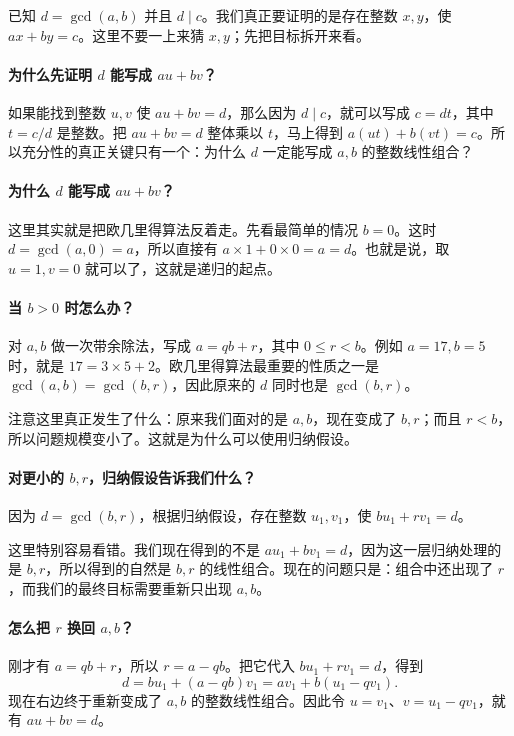 \documentclass[UTF8,a4paper,11pt,twoside,openright,fontset=fandol]{ctexbook}
\theoremstyle{definition}
\begin{document}
\begin{pitfall}[思考：这份证明为什么要这样走？]
已知 $d=\gcd(a,b)$ 并且 $d\mid c$。我们真正要证明的是存在整数 $x,y$，使 $ax+by=c$。这里不要一上来猜 $x,y$；先把目标拆开来看。

\paragraph{为什么先证明 $d$ 能写成 $au+bv$？}
如果能找到整数 $u,v$ 使 $au+bv=d$，那么因为 $d\mid c$，就可以写成 $c=dt$，其中 $t=c/d$ 是整数。把 $au+bv=d$ 整体乘以 $t$，马上得到 $a(ut)+b(vt)=c$。所以充分性的真正关键只有一个：为什么 $d$ 一定能写成 $a,b$ 的整数线性组合？

\paragraph{为什么 $d$ 能写成 $au+bv$？}
这里其实就是把欧几里得算法反着走。先看最简单的情况 $b=0$。这时 $d=\gcd(a,0)=a$，所以直接有 $a\times1+0\times0=a=d$。也就是说，取 $u=1,v=0$ 就可以了，这就是递归的起点。

\paragraph{当 $b>0$ 时怎么办？}
对 $a,b$ 做一次带余除法，写成 $a=qb+r$，其中 $0\le r<b$。例如 $a=17,b=5$ 时，就是 $17=3\times5+2$。欧几里得算法最重要的性质之一是 $\gcd(a,b)=\gcd(b,r)$，因此原来的 $d$ 同时也是 $\gcd(b,r)$。

注意这里真正发生了什么：原来我们面对的是 $a,b$，现在变成了 $b,r$；而且 $r<b$，所以问题规模变小了。这就是为什么可以使用归纳假设。

\paragraph{对更小的 $b,r$，归纳假设告诉我们什么？}
因为 $d=\gcd(b,r)$，根据归纳假设，存在整数 $u_1,v_1$，使 $bu_1+rv_1=d$。

这里特别容易看错。我们现在得到的不是 $au_1+bv_1=d$，因为这一层归纳处理的是 $b,r$，所以得到的自然是 $b,r$ 的线性组合。现在的问题只是：组合中还出现了 $r$，而我们的最终目标需要重新只出现 $a,b$。

\paragraph{怎么把 $r$ 换回 $a,b$？}
刚才有 $a=qb+r$，所以 $r=a-qb$。把它代入 $bu_1+rv_1=d$，得到
\[
 d=bu_1+(a-qb)v_1=av_1+b(u_1-qv_1).
\]
现在右边终于重新变成了 $a,b$ 的整数线性组合。因此令 $u=v_1$、$v=u_1-qv_1$，就有 $au+bv=d$。


\end{pitfall}
\end{document}
